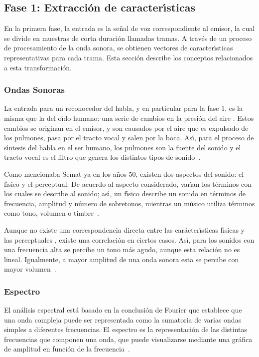 \subsection{Fase 1: Extracci\'on de caracter{\'\i}sticas}
\label{sec:featureExtraction}

En la primera fase, la entrada es la se\~nal de voz correspondiente al emisor, la cual se divide en muestras de corta duraci\'on llamadas tramas. A trav\'es de un proceso de procesamiento de la onda sonora, se obtienen vectores de caracter{\'\i}sticas representativas para cada trama. Esta secci\'on describe los conceptos relacionados a esta transformaci\'on.

\subsubsection{Ondas Sonoras}

La entrada para un reconocedor del habla, y en particular para la fase 1, es la misma que la del o{\'\i}do humano: una serie de cambios en la presi\'on del aire \cite{YoungUniversity2007}. Estos cambios se originan en el emisor, y son causados por el aire que es expulsado de los pulmones, pasa por el tracto vocal y salen por la boca. As{\'\i}, para el proceso de s{\'\i}ntesis del habla en el ser humano, los pulmones son la fuente
del sonido y el tracto vocal es el filtro que genera los distintos tipos de \mbox{sonido \cite{BradburyLineal2000}}.

Como mencionaba Semat ya en los a\~nos 50, existen dos aspectos del sonido: el f{\'\i}sico y el perceptual. De acuerdo al aspecto considerado, var{\'\i}an los t\'erminos con los cuales se describe al sonido; as{\'\i}, un f{\'\i}sico describe un sonido en t\'erminos de frecuencia, amplitud y n\'umero de sobretonos, mientras un m\'usico utiliza t\'erminos como tono, volumen o \mbox{timbre \cite{SematPhysics1958}}.

Aunque no existe una correspondencia directa entre las car\'acter{\'\i}sticas f{\'\i}sicas y las perceptuales \cite{SematPhysics1958}, existe una correlaci\'on en ciertos casos. As{\'\i}, para los sonidos con una frecuencia alta se percibe un tono m\'as agudo, aunque esta relaci\'on no es lineal. Igualmente, a mayor amplitud de una onda sonora esta se percibe con mayor \mbox{volumen \cite{YoungUniversity2007}}.

\subsubsection{Espectro}
El an\'alisis espectral est\'a basado en la conclusi\'on de Fourier que establece que una onda compleja puede ser representada como la sumatoria de varias ondas simples a diferentes frecuencias. El espectro es la representaci\'on de las distintas frecuencias que componen una onda, que puede visualizarse mediante una gr\'afica de amplitud en funci\'on de la \mbox{frecuencia \cite{Jurafsky}}. 

